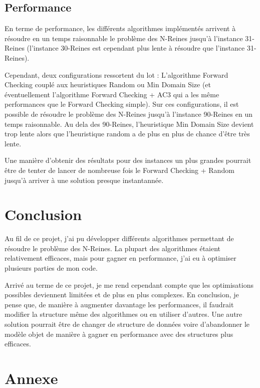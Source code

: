 \documentclass[a4paper,10pt]{article}
\begin{document}
\subsection{Performance}

En terme de performance, les différents algorithmes implémentés arrivent à résoudre en un temps raisonnable le problème des N-Reines jusqu'à l'instance 31-Reines (l'instance 30-Reines est cependant plus lente à résoudre que l'instance 31-Reines).

Cependant, deux configurations ressortent du lot : L'algorithme Forward Checking couplé aux heuristiques Random ou Min Domain Size (et éventuellement l'algorithme Forward Checking + AC3 qui a les même performances que le Forward Checking simple). Sur ces configurations, il est possible de résoudre le problème des N-Reines jusqu'à l'instance 90-Reines en un temps raisonnable. Au dela des 90-Reines, l'heuristique Min Domain Size devient trop lente alors que l'heuristique random a de plus en plus de chance d'être très lente.

Une manière d'obtenir des résultats pour des instances un plus grandes pourrait être de tenter de lancer de nombreuse fois le Forward Checking + Random jusqu'à arriver à une solution presque instantannée.

\section{Conclusion}

Au fil de ce projet, j'ai pu développer différents algorithmes permettant de résoudre le problème des N-Reines. La plupart des algorithmes étaient relativement efficaces, mais pour gagner en performance, j'ai eu à optimiser plusieurs parties de mon code. 

Arrivé au terme de ce projet, je me rend cependant compte que les optimisations possibles deviennent limitées et de plus en plus complexes. En conclusion, je pense que, de manière à augmenter davantage les performances, il faudrait modifier la structure même des algorithmes ou en utiliser d'autres. Une autre solution pourrait être de changer de structure de données voire d'abandonner le modèle objet de manière à gagner en performance avec des structures plus efficaces.

\section{Annexe}
\end{document}
